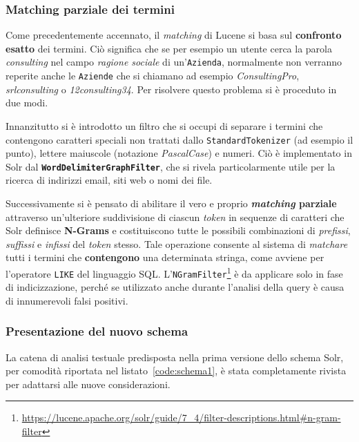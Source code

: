 \subsubsection{Matching parziale dei termini}

Come precedentemente accennato, il \textit{matching} di Lucene si basa sul \textbf{confronto esatto} dei termini. Ciò significa che se per esempio un utente cerca la parola \textit{consulting} nel campo \textit{ragione sociale} di un’\texttt{Azienda}, normalmente non verranno reperite anche le \texttt{Aziende} che si chiamano ad esempio \textit{ConsultingPro}, \textit{srlconsulting} o \textit{12consulting34}. Per risolvere questo problema si è proceduto in due modi.

\vspace{1em}

Innanzitutto si è introdotto un filtro che si occupi di separare i termini che contengono caratteri speciali non trattati dallo \texttt{StandardTokenizer} (ad esempio il punto), lettere maiuscole (notazione \textit{PascalCase}) e numeri. Ciò è implementato in Solr dal \texttt{\textbf{WordDelimiterGraphFilter}}, che si rivela particolarmente utile per la ricerca di indirizzi email, siti web o nomi dei file.

Successivamente si è pensato di abilitare il vero e proprio \textbf{\textit{matching} parziale} attraverso un’ulteriore suddivisione di ciascun \textit{token} in sequenze di caratteri che Solr definisce \textbf{N-Grams} e costituiscono tutte le possibili combinazioni di \textit{prefissi}, \textit{suffissi} e \textit{infissi} del \textit{token} stesso. Tale operazione consente al sistema di \textit{matchare} tutti i termini che \textbf{contengono} una determinata stringa, come avviene per l’operatore \texttt{LIKE} del linguaggio SQL. L’\texttt{NGramFilter}\footnote{\url{https://lucene.apache.org/solr/guide/7_4/filter-descriptions.html\#n-gram-filter}} è da applicare solo in fase di indicizzazione, perché se utilizzato anche durante l’analisi della query è causa di innumerevoli falsi positivi.


\subsubsection{Presentazione del nuovo schema}

La catena di analisi testuale predisposta nella prima versione dello schema Solr, per comodità riportata nel listato~\ref{code:schema1}, è stata completamente rivista per adattarsi alle nuove considerazioni.

